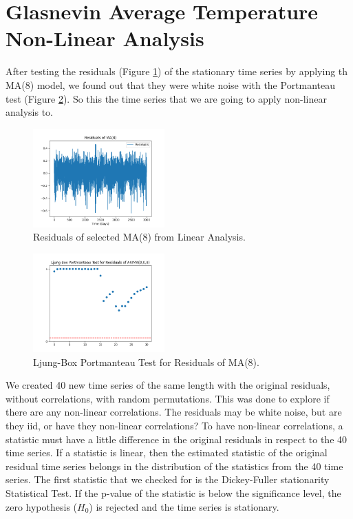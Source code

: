 \documentclass[conference]{IEEEtran}
\begin{document}
\section{Glasnevin Average Temperature \break Non-Linear Analysis}

After testing the residuals (Figure \ref{resg}) of the stationary time series by applying th MA(8) model, we found out that they were white noise with the Portmanteau test (Figure \ref{portg}). So this the time series that we are going to apply non-linear analysis to. 

\begin{figure}[ht]
    \centering
    \includegraphics[width=0.45\textwidth]{Figures/GlasnevinNonLin/Residuals of MA(8).png}
    \caption{Residuals of selected MA(8) from Linear Analysis.}
    \label{resg}
\end{figure}

\begin{figure}[ht]
    \centering
    \includegraphics[width=0.45\textwidth]{Figures/GlasnevinNonLin/Ljung-Box Portmanteau Test for Residuals of ARIMA(0,0,8).png}
    \caption{Ljung-Box Portmanteau Test for Residuals of MA(8).}
    \label{portg}
\end{figure}

We created 40 new time series of the same length with the original residuals, without correlations, with random permutations. This was done to explore if there are any non-linear correlations. The residuals may be white noise, but are they iid, or have they non-linear correlations? To have non-linear correlations, a statistic must have a little difference in the original residuals in respect to the 40 time series. If a statistic is linear, then the estimated statistic of the original residual time series belongs in the distribution of the statistics from the 40 time series. The first statistic that we checked for is the Dickey-Fuller stationarity Statistical Test. If the p-value of the statistic is below the significance level, the zero hypothesis ($H_0$) is rejected and the time series is stationary.
\end{document}
